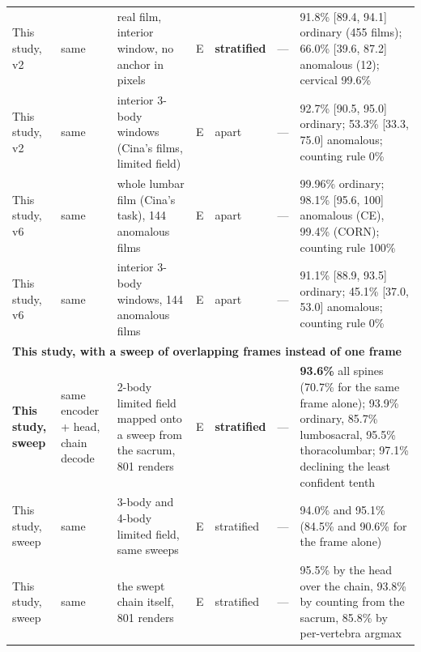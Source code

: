 \documentclass[11pt,letterpaper]{article}
\newcommand{\ci}[2]{[#1, #2]}
\begin{document}
\begin{table}[h]
{\begin{tabular}{lllllll}
This study, v2 & same & real film, interior window, no anchor in pixels & E & \textbf{stratified} & --- & 91.8\% \ci{89.4}{94.1} ordinary (455 films); 66.0\% \ci{39.6}{87.2} anomalous (12); cervical 99.6\% \\
This study, v2 & same & interior 3-body windows (Cina's films, limited field) & E & apart & --- & 92.7\% \ci{90.5}{95.0} ordinary; 53.3\% \ci{33.3}{75.0} anomalous; counting rule 0\% \\
This study, v6 & same & whole lumbar film (Cina's task), 144 anomalous films & E & apart & --- & 99.96\% ordinary; 98.1\% \ci{95.6}{100} anomalous (CE), 99.4\% (CORN); counting rule 100\% \\
This study, v6 & same & interior 3-body windows, 144 anomalous films & E & apart & --- & 91.1\% \ci{88.9}{93.5} ordinary; 45.1\% \ci{37.0}{53.0} anomalous; counting rule 0\% \\ \midrule
\multicolumn{7}{l}{\textbf{This study, with a sweep of overlapping frames instead of one frame}} \\
\textbf{This study, sweep} & same encoder + head, chain decode & 2-body limited field mapped onto a sweep from the sacrum, 801 renders & E & \textbf{stratified} & --- & \textbf{93.6\%} all spines (70.7\% for the same frame alone); 93.9\% ordinary, 85.7\% lumbosacral, 95.5\% thoracolumbar; 97.1\% declining the least confident tenth \\
This study, sweep & same & 3-body and 4-body limited field, same sweeps & E & stratified & --- & 94.0\% and 95.1\% (84.5\% and 90.6\% for the frame alone) \\
This study, sweep & same & the swept chain itself, 801 renders & E & stratified & --- & 95.5\% by the head over the chain, 93.8\% by counting from the sacrum, 85.8\% by per-vertebra argmax \\ \bottomrule
\end{tabular}}
\end{table}

\begin{table}[h]\centering\small
\caption{The serial sweep. Each arm simulates the protocol on one collection: frames of a stated physical span, a jittered step, and independent degradation per frame. \emph{Chain complete} is the share of spines whose chain of vertebrae had no duplicated, missed or spurious node; \emph{chain named} is exact naming of the chain by the run-level head. The last three columns are one limited-field frame named on its own pixels, then the same frame registered onto the sweep. Generated from \texttt{SWEEP\_TABLE.json} by \texttt{tools/make\_sweep\_figure.py}.}
\end{table}
\end{document}
